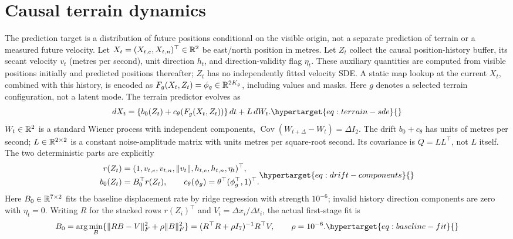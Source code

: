\section{Causal terrain dynamics}
The prediction target is a distribution of future positions conditional on
the visible origin, not a separate prediction of terrain or a measured
future velocity. Let \(X_t=(X_{t,e},X_{t,n})^\top\in\mathbb{R}^2\) be east/north
position in metres. Let \(Z_t\) collect the causal position-history buffer,
its secant velocity \(v_t\) (metres per second), unit direction \(h_t\),
and direction-validity flag \(\eta_t\). These auxiliary quantities are
computed from visible positions initially and predicted positions thereafter;
\(Z_t\) has no independently fitted velocity SDE. A static map lookup at
the current \(X_t\), combined with this history, is encoded as
\(F_g(X_t,Z_t)=\phi_g\in\mathbb{R}^{2K_g}\), including values and masks.
Here \(g\) denotes a selected terrain configuration, not a latent mode.
The terrain predictor evolves as
\begin{equation}
 dX_t=\{b_0(Z_t)+c_\theta(F_g(X_t,Z_t))\}\,dt+L\,dW_t .
 \label{eq:terrain-sde}\hypertarget{eq:terrain-sde}{}
\end{equation}
\(W_t\in\mathbb{R}^2\) is a standard Wiener process with independent components,
\(\operatorname{Cov}(W_{t+\Delta}-W_t)=\Delta I_2\).
The drift \(b_0+c_\theta\) has units of metres per second;
\(L\in\mathbb{R}^{2\times2}\) is a constant noise-amplitude matrix with units
metres per square-root second. Its covariance is \(Q=LL^\top\), not \(L\)
itself. The two deterministic parts are explicitly
\begin{equation}
 \begin{aligned}
 r(Z_t)&=(1,v_{t,e},v_{t,n},\|v_t\|,h_{t,e},h_{t,n},\eta_t)^\top,\\
 b_0(Z_t)&=B_0^\top r(Z_t),\qquad
 c_\theta(\phi_g)=\theta^\top(\phi_g^\top,1)^\top .
 \end{aligned}
 \label{eq:drift-components}\hypertarget{eq:drift-components}{}
\end{equation}
Here \(B_0\in\mathbb{R}^{7\times2}\) fits the baseline displacement rate by
ridge regression with strength \(10^{-6}\); invalid history direction
components are zero with \(\eta_t=0\).
Writing \(R\) for the stacked rows \(r(Z_i)^\top\) and \(V_i=\Delta x_i/\Delta t_i\),
the actual first-stage fit is
\begin{equation}
 B_0=\arg\min_B\{\|RB-V\|_F^2+\rho\|B\|_F^2\}
     =(R^\top R+\rho I_7)^{-1}R^\top V,\qquad\rho=10^{-6}.
 \label{eq:baseline-fit}\hypertarget{eq:baseline-fit}{}
\end{equation}

